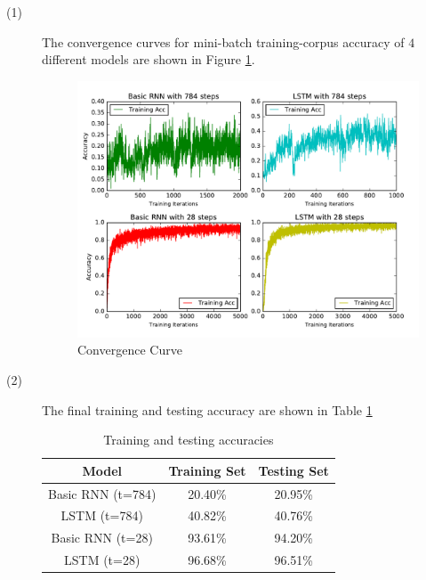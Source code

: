 \begin{description}

\item[(1) ] The convergence curves for mini-batch training-corpus accuracy of $4$ different models are shown in Figure \ref{fig:curve}.

\begin{figure}[H]
\centering
\includegraphics[width=1.0\textwidth]{./figures/convergence.pdf}
\caption{\label{fig:curve} Convergence Curve}
\end{figure}


\item[(2) ] The final training and testing accuracy are shown in Table \ref{table:accuracy}

\begin{table}[H]
	\centering
	\caption{Training and testing accuracies}
	\label{table:accuracy}	
	\begin{tabular}{c | c | c }
		\hline \hline
		Model 				&	Training Set	&  Testing Set \\[0.1cm]
		\hline
		Basic RNN (t=784) 	&	20.40\%			&  20.95\%     \\[0.1cm]
		LSTM (t=784)		&	40.82\%			&  40.76\%     \\[0.1cm]   
		Basic RNN (t=28)	&	93.61\%			&  94.20\%     \\[0.1cm]
		LSTM (t=28)			&	96.68\%			&  96.51\%     \\[0.1cm]
		\hline	
	\end{tabular}
\end{table}

\end{description}


\clearpage

%
%
%



